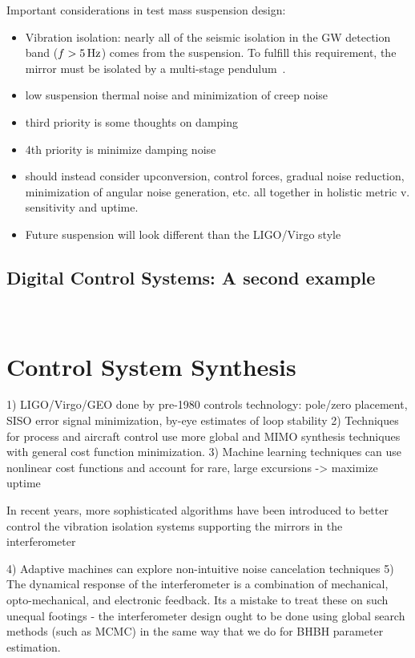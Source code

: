 Important considerations in test mass suspension design\cite{SUS:2012, Aston:2012}:
\begin{itemize}
   \item Vibration isolation: nearly all of the seismic isolation in the GW detection band ($f > 5\,\rm Hz$)
     comes from the suspension. To fulfill this requirement, the mirror must be isolated by a 
     multi-stage pendulum~\cite{Beker:2011}.
    \item low suspension thermal noise and minimization of creep noise~\cite{Levin:2012ek, Gretarsson:2005gs}
    \item third priority is some thoughts on damping
    \item 4th priority is minimize damping noise
    \item should instead consider upconversion, control forces, gradual noise reduction, minimization of angular noise generation, etc. all together in holistic metric v. sensitivity and uptime.
    \item Future suspension will look different than the LIGO/Virgo style
\end{itemize}

\subsection{Digital Control Systems: A second example}

​\section{Control System Synthesis}
  1) LIGO/Virgo/GEO done by pre-1980 controls technology: pole/zero placement, SISO error signal minimization, by-eye estimates of loop stability
  2) Techniques for process and aircraft control use more global and MIMO synthesis techniques with general cost function minimization.
  3) Machine learning techniques can use nonlinear cost functions and account for rare, large excursions -> maximize uptime

In recent years, more sophisticated algorithms have been introduced to 
better control the vibration isolation
systems supporting the mirrors in the 
interferometer~\cite{Beker:2014, Driggers:2012fl, Ryan:FFW2012}

  4) Adaptive machines can explore non-intuitive noise cancelation techniques​
  5) The dynamical response of the interferometer is a combination of mechanical, opto-mechanical, and electronic feedback. Its a mistake to treat these on such unequal footings - the interferometer design ought to be done using global search methods (such as MCMC) in the same way that we do for BHBH parameter estimation.






